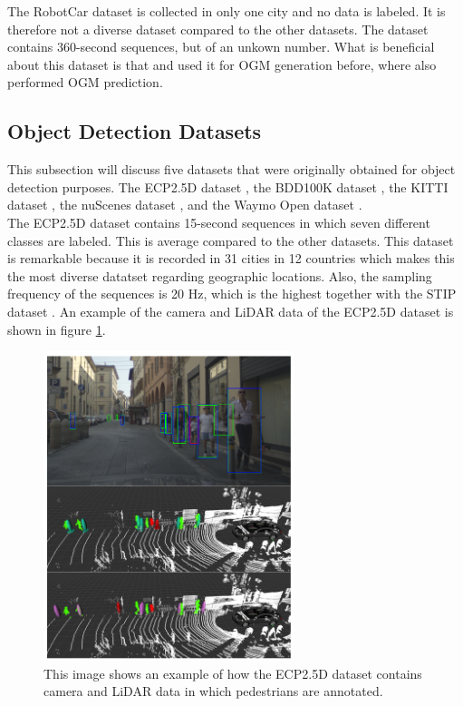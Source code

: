 The RobotCar dataset \cite{robotcardatasetijrr} is collected in only one city and no data is labeled. It is therefore not a diverse dataset compared to the other datasets. The dataset contains 360-second sequences, but of an unkown number. What is beneficial about this dataset is that \cite{dequaire2018deep} and \cite{wang2020l2r} used it for \gls{OGM} generation before, where \cite{dequaire2018deep} also performed \gls{OGM} prediction.


\subsection{Object Detection Datasets} \label{subsec:data_ob_det}
This subsection will discuss five datasets that were originally obtained for object detection purposes. The \gls{ECP2.5D} dataset \cite{braun2020ecp2}, the \gls{BDD100K} dataset \cite{yu2020bdd100k}, the \gls{KITTI} dataset \cite{geiger2012we}, the nuScenes dataset \cite{caesar2020nuscenes}, and the Waymo Open dataset \cite{sun2020scalability}. \\

The \gls{ECP2.5D} dataset \cite{braun2020ecp2} contains 15-second sequences in which seven different classes are labeled. This is average compared to the other datasets. This dataset is remarkable because it is recorded in 31 cities in 12 countries which makes this the most diverse datatset regarding geographic locations. Also, the sampling frequency of the sequences is 20 Hz, which is the highest together with the \gls{STIP} dataset \cite{liu2020spatiotemporal}. An example of the camera and LiDAR data of the \gls{ECP2.5D} dataset \cite{braun2020ecp2} is shown in figure \ref{fig:dat_ecp}. \\

\begin{figure}[h!]
	\centering
	\includegraphics[width=0.4\linewidth]{Figures/Datasets/ECP_Dataset}
	\caption{This image shows an example of how the \gls{ECP2.5D} \cite{braun2020ecp2} dataset contains camera and LiDAR data in which pedestrians are annotated.}  
	\label{fig:dat_ecp}
\end{figure}

